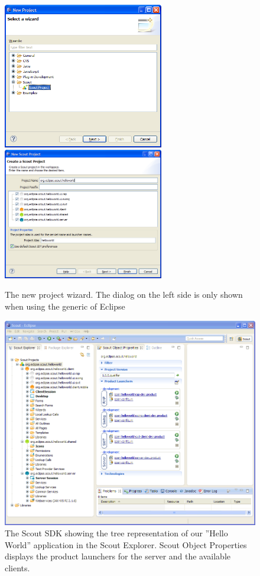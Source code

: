 \documentclass[a4paper,10pt,twoside]{book}
\begin{document}
\begin{figure}
\includegraphics[width=7cm]{sdk_new_project_1.png} \hspace{5mm}
\includegraphics[width=7cm]{sdk_new_project_2.png}
\caption{The new project wizard. The dialog on the left side is only shown when using the generic  of Eclipse}
\end{figure}

\begin{figure}
\includegraphics[width=14cm]{sdk_initial_helloworld_project.png}
\caption{The Scout SDK showing the tree representation of our ''Hello World'' application in the Scout Explorer.
Scout Object Properties displays the product launchers for the server and the available clients.}
\end{figure}
\end{document}
